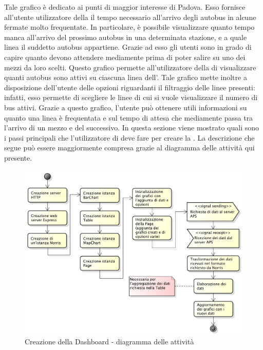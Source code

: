     		Tale grafico è dedicato ai punti di maggior interesse di Padova. Esso fornisce all'utente utilizzatore della  il tempo necessario all'arrivo degli autobus in alcune fermate  molto frequentate. In particolare, è possibile visualizzare quanto tempo manca all'arrivo del prossimo autobus in una determinata stazione, e a quale linea il suddetto autobus appartiene. Grazie ad esso gli utenti sono in grado di capire quanto devono attendere mediamente prima di poter salire su uno dei mezzi da loro scelti.
    		Questo grafico permette all'utilizzatore della  di visualizzare quanti autobus sono attivi su ciascuna linea dell'. Tale grafico mette inoltre a disposizione dell'utente delle opzioni riguardanti il filtraggio delle linee presenti: infatti, esso permette di scegliere le linee di cui si vuole visualizzare il numero di bus attivi. Grazie a questo grafico, l'utente può ottenere utili informazioni su quanto una linea è frequentata e sul tempo di attesa che mediamente passa tra l'arrivo di un mezzo e del successivo.
        In questa sezione viene mostrato quali sono i passi principali che l'utilizzatore di  deve fare per creare la  . La descrizione che segue può essere maggiormente compresa grazie al diagramma delle attività qui presente.
        \begin{figure}[H]\centering
            \includegraphics[width=\textwidth]{SpecificaTecnica/Pics/CreateDashboard.pdf}
            \caption{Creazione della Dashboard - diagramma delle attività}
        \end{figure}
